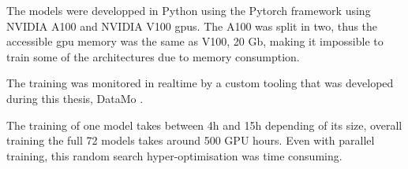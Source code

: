\documentclass[../main.tex]{subfiles}
\begin{document}
\hfill

The models were developped in Python using the Pytorch framework \cite{ansel_pytorch_2024} using  NVIDIA A100 \cite{noauthor_nvidia_nodate-1} and NVIDIA V100 \cite{noauthor_nvidia_nodate-2} gpus. The A100 was split in two, thus the accessible gpu memory was the same as V100, 20 Gb, making it impossible to train some of the architectures due to memory consumption.

The training was monitored in realtime by a custom tooling that was developed during this thesis, DataMo \cite{imbert_leonard-imbertdatamo_2024}.

The training of one model takes between 4h and 15h depending of its size, overall training the full 72 models takes around 500 GPU hours. Even with parallel training, this random search hyper-optimisation was time consuming.


\end{document}

